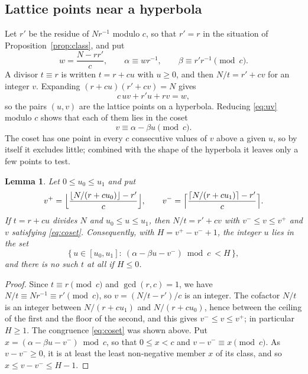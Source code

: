 \documentclass[screen,reqno]{aomart}
\numberwithin{equation}{section}
\theoremstyle{plain}
\newtheorem{lemma}[theorem]{Lemma}
\theoremstyle{definition}
\theoremstyle{remark}
\begin{document}
\subsection{Lattice points near a hyperbola}\label{sec:lattice}
Let $r'$ be the residue of $Nr^{-1}$ modulo $c$, so that $r'=r$ in the
situation of Proposition~\ref{prop:class}, and put
\[
  w=\frac{N-rr'}{c},\qquad \alpha\equiv wr^{-1},\qquad
  \beta\equiv r'r^{-1}\pmod c .
\]
A divisor $t\equiv r$ is written $t=r+cu$ with $u\ge0$, and then
$N/t=r'+cv$ for an integer $v$. Expanding
$(r+cu)(r'+cv)=N$ gives
\begin{equation}\label{eq:uv}
  c\,uv+r'u+rv=w ,
\end{equation}
so the pairs $(u,v)$ are the lattice points on a hyperbola. Reducing
\eqref{eq:uv} modulo $c$ shows that each of them lies in the coset
\begin{equation}\label{eq:coset}
  v\equiv\alpha-\beta u\pmod c .
\end{equation}
The coset has one point in every $c$ consecutive values of $v$ above a
given $u$, so by itself it excludes little; combined with the shape of
the hyperbola it leaves only a few points to test.

\begin{lemma}\label{lem:box}
Let $0\le u_0\le u_1$ and put
\[
  v^+=\Bigl\lfloor\frac{\lfloor N/(r+cu_0)\rfloor-r'}{c}\Bigr\rfloor,\qquad
  v^-=\Bigl\lceil\frac{\lceil N/(r+cu_1)\rceil-r'}{c}\Bigr\rceil .
\]
If $t=r+cu$ divides $N$ and $u_0\le u\le u_1$, then $N/t=r'+cv$ with
$v^-\le v\le v^+$ and $v$ satisfying \eqref{eq:coset}. Consequently,
with $H=v^+-v^-+1$, the integer $u$ lies in the set
\begin{equation}\label{eq:window}
  \bigl\{\,u\in[u_0,u_1]:\ (\alpha-\beta u-v^-)\bmod c\ <H\,\bigr\},
\end{equation}
and there is no such $t$ at all if $H\le0$.
\end{lemma}

\begin{proof}
Since $t\equiv r\pmod c$ and $\gcd(r,c)=1$, we have
$N/t\equiv Nr^{-1}\equiv r'\pmod c$, so $v=(N/t-r')/c$ is an integer.
The cofactor $N/t$ is an integer between $N/(r+cu_1)$ and
$N/(r+cu_0)$, hence between the ceiling of the first and the floor of
the second, and this gives $v^-\le v\le v^+$; in particular $H\ge1$.
The congruence \eqref{eq:coset} was shown above. Put
$x=(\alpha-\beta u-v^-)\bmod c$, so that $0\le x<c$ and
$v-v^-\equiv x\pmod c$. As $v-v^-\ge0$, it is at least the least
non-negative member $x$ of its class, and so $x\le v-v^-\le H-1$.
\end{proof}
\end{document}
